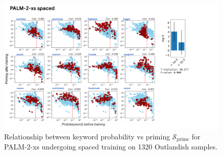 \documentclass[11pt, a4paper, logo, copyright]{googledeepmind}
\theoremstyle{plain}
\theoremstyle{definition}
\theoremstyle{remark}
\begin{document}
\begin{figure}[h]
\vspace{0mm}
    \centering \includegraphics[scale=.35,clip]{figures/spaced_App.pdf}
    \vspace{-1mm}
    \caption{Relationship between keyword probability vs priming $\mathcal{S}_\text{prime}$ for PALM-2-xs undergoing spaced training on 1320 Outlandish samples.} \label{fig:spaced_App}
  \vspace{-0mm}
\end{figure}
\end{document}
